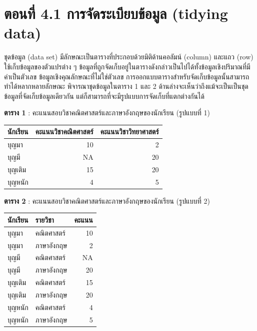 \documentclass[
  letterpaper,
  DIV=11,
  numbers=noendperiod]{scrreprt}
\begin{document}

\hypertarget{uxe15uxe2duxe19uxe17-4.1-uxe01uxe32uxe23uxe08uxe14uxe23uxe30uxe40uxe1auxe22uxe1auxe02uxe2duxe21uxe25-tidying-data}{%
\chapter*{ตอนที่ 4.1 การจัดระเบียบข้อมูล (tidying
data)}\label{uxe15uxe2duxe19uxe17-4.1-uxe01uxe32uxe23uxe08uxe14uxe23uxe30uxe40uxe1auxe22uxe1auxe02uxe2duxe21uxe25-tidying-data}}

ชุดข้อมูล (data set) มีลักษณะเป็นตารางที่ประกอบด้วยมิติด้านคอลัมน์ (column) และแถว
(row) ใช้เก็บข้อมูลของตัวแปรต่าง ๆ
ข้อมูลที่ถูกจัดเก็บอยู่ในตารางดังกล่าวเป็นไปได้ทั้งข้อมูลเชิงปริมาณที่มีค่าเป็นตัวเลข
ข้อมูลเชิงคุณลักษณะที่ไม่ใช่ตัวเลข
การออกแบบตารางสำหรับจัดเก็บข้อมูลนั้นสามารถทำได้หลากหลายลักษณะ
พิจารณาชุดข้อมูลในตาราง 1 และ 2
ด้านล่างจะเห็นว่าถึงแม้จะเป็นเป็นชุดข้อมูลที่จัดเก็บข้อมูลเดียวกัน
แต่ก็สามารถที่จะมีรูปแบบการจัดเก็บที่แตกต่างกันได้

\textbf{ตาราง 1} : คะแนนสอบวิชาคณิตศาสตร์และภาษาอังกฤษของนักเรียน (รูปแบบที่ 1)

\begingroup\fontsize{15}{17}\selectfont

\begin{tabular}{l|r|r}
\hline
นักเรียน & คะแนนวิชาคณิตศาสตร์ & คะแนนวิชาวิทยาศาสตร์\\
\hline
บุญมา & 10 & 2\\
\hline
บุญมี & NA & 20\\
\hline
บุญเติม & 15 & 20\\
\hline
บุญหนัก & 4 & 5\\
\hline
\end{tabular}
\endgroup{}

\textbf{ตาราง 2} : คะแนนสอบวิชาคณิตศาสตร์และภาษาอังกฤษของนักเรียน (รูปแบบที่ 2)

\begingroup\fontsize{15}{17}\selectfont

\begin{tabular}{l|l|r}
\hline
นักเรียน & รายวิชา & คะแนน\\
\hline
บุญมา & คณิตศาสตร์ & 10\\
\hline
บุญมา & ภาษาอังกฤษ & 2\\
\hline
บุญมี & คณิตศาสตร์ & NA\\
\hline
บุญมี & ภาษาอังกฤษ & 20\\
\hline
บุญเติม & คณิตศาสตร์ & 15\\
\hline
บุญเติม & ภาษาอังกฤษ & 20\\
\hline
บุญหนัก & คณิตศาสตร์ & 4\\
\hline
บุญหนัก & ภาษาอังกฤษ & 5\\
\hline
\end{tabular}
\endgroup{}
\end{document}
